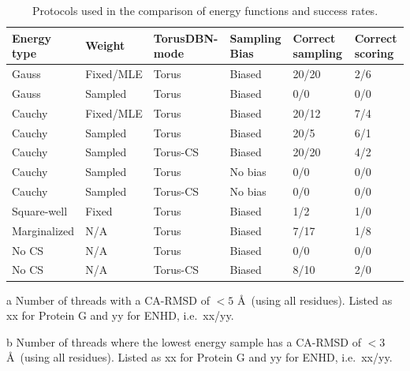 \begin{table}[h]
    \caption{Protocols used in the comparison of energy functions and success rates.}
    \begin{center}
    \begin{threeparttable}
    \begin{tabular}{l l l l l l}
Energy type & Weight  & TorusDBN-mode & Sampling Bias & Correct sampling\tnote{a} & Correct scoring\tnote{b}\\\hline
Gauss         & Fixed/MLE   & Torus       & Biased   & 20/20  & 2/6  \\
Gauss         & Sampled & Torus       & Biased   &  0/0   & 0/0  \\
Cauchy        & Fixed/MLE   & Torus       & Biased   & 20/12  & 7/4  \\
Cauchy        & Sampled & Torus       & Biased   & 20/5   & 6/1  \\
Cauchy        & Sampled & Torus-CS    & Biased   & 20/20  & 4/2  \\
Cauchy        & Sampled & Torus       & No bias  &  0/0   & 0/0  \\
Cauchy        & Sampled & Torus-CS    & No bias  &  0/0   & 0/0  \\
Square-well   & Fixed   & Torus       & Biased   &  1/2   & 1/0  \\
Marginalized  & N/A     & Torus       & Biased   &  7/17  & 1/8  \\
No CS         & N/A     & Torus       & Biased   &  0/0   & 0/0  \\
No CS         & N/A     & Torus-CS    & Biased   &  8/10  & 2/0
    \end{tabular}
    \begin{tablenotes}
        \item[a] Number of threads with a CA-RMSD of $<5$ \AA\ (using all residues). Listed as xx for Protein G and yy for ENHD, i.e.~xx/yy.\\
        \item[b] Number of threads where the lowest energy sample has a CA-RMSD of $<3$ \AA\ (using all residues). Listed as xx for Protein G and yy for ENHD, i.e.~xx/yy.\\
    \end{tablenotes}
    \end{threeparttable}
    \end{center}
    \label{tab:prior_folds}
\end{table}

